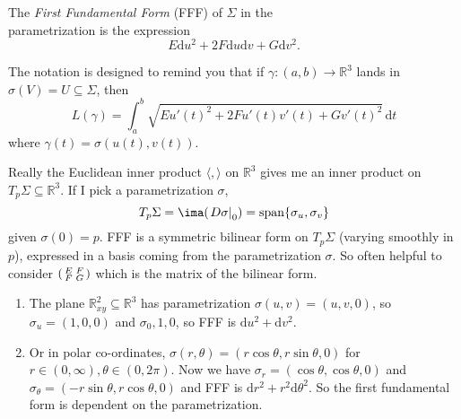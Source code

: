 \begin{definition}{}{}
    The \textit{First Fundamental Form} (FFF) of \(\Sigma\) in the\\ parametrization is the expression
    \[
        E \mathrm{d}u^2 + 2F \mathrm{d}u\mathrm{d}v + G \mathrm{d}v^2.
    \]
\end{definition}
The notation is designed to remind you that if \(\gamma: (a,b) \to \mathbb{R}^3\) lands in \(\sigma(V) = U \subseteq \Sigma\), then
\[
    L(\gamma) = \int_{a}^{b} \sqrt{Eu'(t)^2 + 2Fu'(t)v'(t) + Gv'(t)^2}  \,\mathrm{d}t
\]
where \(\gamma(t) = \sigma(u(t), v(t))\).
\begin{remark}
    Really the Euclidean inner product \(\langle,\rangle\) on \(\mathbb{R}^3\) gives me an inner product on \(T_p\Sigma \subseteq \mathbb{R}^3\). If I pick a parametrization \(\sigma\),
    \[T_p\Sigma = \ima(\left.D\sigma\right|_0) = \mathrm{span}\{\sigma_u, \sigma_v\}\] given \(\sigma(0) = p\).
    FFF is a symmetric bilinear form on \(T_p\Sigma\) (varying smoothly in \(p\)), expressed in a basis coming from the parametrization \(\sigma\). So often helpful to consider \(\begin{psmallmatrix}
        E &  F \\
        F &  G \\
    \end{psmallmatrix}\) which is the matrix of the bilinear form.
\end{remark}
\begin{example}
    \leavevmode
    \begin{enumerate}
        \item The plane \(\mathbb{R}^2_{xy}\subseteq \mathbb{R}^3\) has parametrization \(\sigma(u,v) = (u,v,0)\), so \(\sigma_u = (1,0,0)\) and \(\sigma_0,1,0\), so FFF is \(\mathrm{d}u^2 + \mathrm{d}v^2\).
        \item Or in polar co-ordinates, \(\sigma(r, \theta) = (r\cos \theta, r\sin \theta, 0)\) for \(r \in (0, \infty), \theta \in (0, 2\pi)\). Now we have \(\sigma_r = (\cos \theta, \cos \theta, 0)\) and \(\sigma_\theta = (-r \sin \theta, r\cos \theta, 0)\) and FFF is \(\mathrm{d}r^2 + r^2 \mathrm{d}\theta^2\). So the first fundamental form is dependent on the parametrization.
    \end{enumerate}
\end{example}
